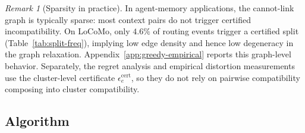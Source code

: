 \documentclass{article}
\theoremstyle{plain}
\theoremstyle{definition}
\theoremstyle{remark}
\newtheorem{remark}{Remark}
\newcommand{\eps}{\epsilon}
\begin{document}
\begin{remark}[Sparsity in practice]
\label{rem:sparsity}
In agent-memory applications, the cannot-link graph is typically sparse:
most context pairs do not trigger certified incompatibility. On LoCoMo,
only \(4.6\%\) of routing events trigger a certified split
(Table~\ref{tab:split-freq}), implying low edge density and hence low
degeneracy in the graph relaxation. Appendix~\ref{app:greedy-empirical}
reports this graph-level behavior. Separately, the regret analysis and
empirical distortion measurements use the cluster-level certificate
\(\eps^{\mathrm{cert}}_e\), so they do not rely on pairwise compatibility
composing into cluster compatibility.
\end{remark}

\clearpage
\subsection{Algorithm}
\label{app:DeMem-algorithm}
\end{document}
